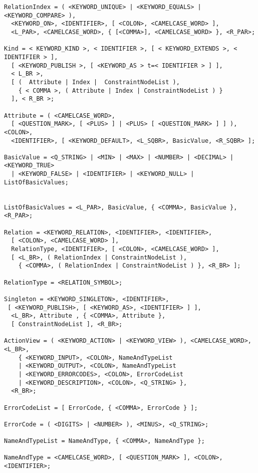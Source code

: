 \begin{lstlisting}[basicstyle={\scriptsize\sffamily},breaklines=true,showstringspaces=false,tabsize=2]
RelationIndex = ( <KEYWORD_UNIQUE> | <KEYWORD_EQUALS> | <KEYWORD_COMPARE> ),
  <KEYWORD_ON>, <IDENTIFIER>, [ <COLON>, <CAMELCASE_WORD> ],
  <L_PAR>, <CAMELCASE_WORD>, { [<COMMA>], <CAMELCASE_WORD> }, <R_PAR>;

Kind = < KEYWORD_KIND >, < IDENTIFIER >, [ < KEYWORD_EXTENDS >, < IDENTIFIER > ],
  [ <KEYWORD_PUBLISH >, [ <KEYWORD_AS > t=< IDENTIFIER > ] ],
  < L_BR >,
  [ (  Attribute | Index |  ConstraintNodeList ),
  	{ < COMMA >, ( Attribute | Index | ConstraintNodeList ) }
  ], < R_BR >;

Attribute = ( <CAMELCASE_WORD>,
  [ <QUESTION_MARK>, [ <PLUS> ] | <PLUS> [ <QUESTION_MARK> ] ] ), <COLON>,
  <IDENTIFIER>, [ <KEYWORD_DEFAULT>, <L_SQBR>, BasicValue, <R_SQBR> ];

BasicValue = <Q_STRING> | <MIN> | <MAX> | <NUMBER> | <DECIMAL> | <KEYWORD_TRUE>
  | <KEYWORD_FALSE> | <IDENTIFIER> | <KEYWORD_NULL> | ListOfBasicValues;


ListOfBasicValues = <L_PAR>, BasicValue, { <COMMA>, BasicValue }, <R_PAR>;

Relation = <KEYWORD_RELATION>, <IDENTIFIER>, <IDENTIFIER>,
  [ <COLON>, <CAMELCASE_WORD> ],
  RelationType, <IDENTIFIER>, [ <COLON>, <CAMELCASE_WORD> ],
  [ <L_BR>, ( RelationIndex | ConstraintNodeList ),
	{ <COMMA>, ( RelationIndex | ConstraintNodeList ) }, <R_BR> ];

RelationType = <RELATION_SYMBOL>;

Singleton = <KEYWORD_SINGLETON>, <IDENTIFIER>,
 [ <KEYWORD_PUBLISH>, [ <KEYWORD_AS>, <IDENTIFIER> ] ],
  <L_BR>, Attribute , { <COMMA>, Attribute },
  [ ConstraintNodeList ], <R_BR>;

ActionView = ( <KEYWORD_ACTION> | <KEYWORD_VIEW> ), <CAMELCASE_WORD>, <L_BR>,
	{ <KEYWORD_INPUT>, <COLON>, NameAndTypeList
    | <KEYWORD_OUTPUT>, <COLON>, NameAndTypeList
    | <KEYWORD_ERRORCODES>, <COLON>, ErrorCodeList
    | <KEYWORD_DESCRIPTION>, <COLON>, <Q_STRING> },
  <R_BR>;

ErrorCodeList = [ ErrorCode, { <COMMA>, ErrorCode } ];

ErrorCode = ( <DIGITS> | <NUMBER> ), <MINUS>, <Q_STRING>;

NameAndTypeList = NameAndType, { <COMMA>, NameAndType };

NameAndType = <CAMELCASE_WORD>, [ <QUESTION_MARK> ], <COLON>, <IDENTIFIER>;
\end{lstlisting}

